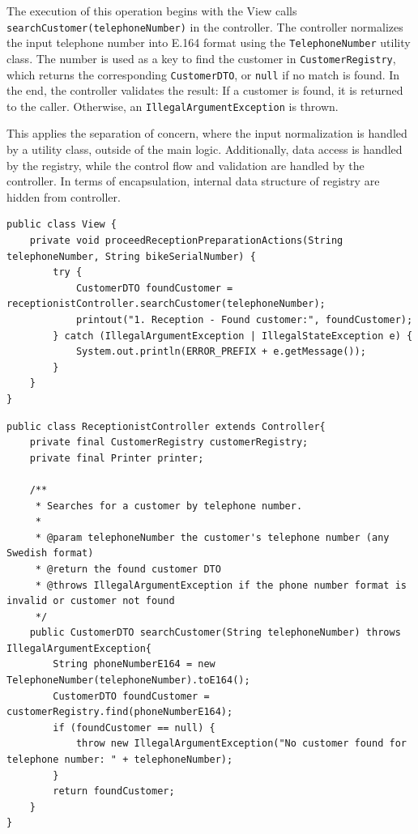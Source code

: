 \documentclass[a4paper]{scrartcl}
\begin{document}
The execution of this operation begins with the View calls \texttt{searchCustomer(telephoneNumber)} in the controller. The controller normalizes the input telephone number into E.164 format using the \texttt{TelephoneNumber} utility class. The number is used as a key to find the customer in \texttt{CustomerRegistry}, which returns the corresponding \texttt{CustomerDTO}, or \texttt{null} if no match is found. In the end, the controller validates the result: If a customer is found, it is returned to the caller. Otherwise, an \texttt{IllegalArgumentException} is thrown.

This applies the separation of concern, where the input normalization is handled by a utility class, outside of the main logic. Additionally, data access is handled by the registry, while the control flow and validation are handled by the controller. In terms of encapsulation, internal data structure of registry are hidden from controller. 

\begin{lstlisting}[style=javastyle, caption={Main class entry point}]
public class View {
    private void proceedReceptionPreparationActions(String telephoneNumber, String bikeSerialNumber) {
        try {
            CustomerDTO foundCustomer = receptionistController.searchCustomer(telephoneNumber);
            printout("1. Reception - Found customer:", foundCustomer);
        } catch (IllegalArgumentException | IllegalStateException e) {
            System.out.println(ERROR_PREFIX + e.getMessage());
        }
    }
}
\end{lstlisting}

\begin{lstlisting}[style=javastyle, caption={Main class entry point}]
public class ReceptionistController extends Controller{
    private final CustomerRegistry customerRegistry;
    private final Printer printer;

    /**
     * Searches for a customer by telephone number.
     *
     * @param telephoneNumber the customer's telephone number (any Swedish format)
     * @return the found customer DTO
     * @throws IllegalArgumentException if the phone number format is invalid or customer not found
     */
    public CustomerDTO searchCustomer(String telephoneNumber) throws IllegalArgumentException{
        String phoneNumberE164 = new TelephoneNumber(telephoneNumber).toE164();
        CustomerDTO foundCustomer = customerRegistry.find(phoneNumberE164);
        if (foundCustomer == null) {
            throw new IllegalArgumentException("No customer found for telephone number: " + telephoneNumber);
        }
        return foundCustomer;
    }
}
\end{lstlisting}
\end{document}
